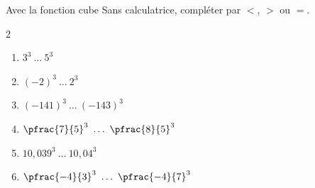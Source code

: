 \begin{exo}{Avec la fonction cube}
	Sans calculatrice, compléter par $<$, $>$ ou $=$.
	\vspace*{-2mm}
	\begin{multicols}{2}
		\begin{enumerate}[itemsep=2mm]
			\item $3^3 \ \dots \ 5^3$
			\item $(-2)^3 \ \dots \ 2^3$
			\item $(-141)^3 \ \dots \ (-143)^3$
			\item $\pfrac{7}{5}^3 \ \dots \ \pfrac{8}{5}^3$
			\item $10,039^3 \ \dots \ 10,04^3$
			\item $\pfrac{-4}{3}^3 \ \dots \ \pfrac{-4}{7}^3$
		\end{enumerate}
	\end{multicols}\vspace*{-2mm}
\end{exo}
